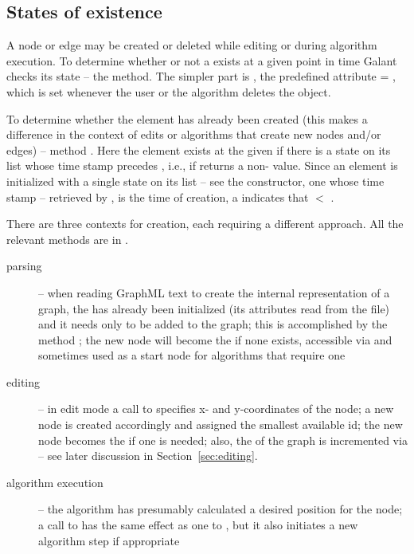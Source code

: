 \subsection{States of existence}

A node or edge may be created or deleted while editing or during algorithm
execution. To determine whether or not a  exists at a
given point in time Galant checks its state -- the 
method. The simpler part is , the predefined attribute
 = , which is set whenever the user or the
algorithm deletes the object.

To determine whether the element has already been created (this makes a
difference in the context of edits or algorithms that create new nodes and/or
edges) -- method . Here the element exists at the
given  if there is a state on its list whose time stamp precedes
, i.e., if  returns a non-
value. Since an element is initialized with a single state on its list -- see
the constructor, one
whose time stamp -- retrieved by , is the time of creation, a 
indicates that  $<$ .

There are three contexts for  creation, each requiring a different
approach. All the relevant methods are in .
\begin{description}
\item[parsing] -- when reading GraphML text to create the internal
  representation of a graph, the  has already been initialized
  (its attributes read from the file) and it needs only to be added to the
  graph; this is accomplished by the method ; the new
  node will become the  if none exists, accessible via
   and sometimes used as a start node for algorithms
  that require one
\item[editing] -- in edit mode a call to
   specifies x- and y-coordinates of
  the node; a new node is created accordingly and assigned the smallest
  available id; the new node becomes the  if one is
  needed; also, the  of the graph is
  incremented via  -- see later
  discussion in Section~\ref{sec:editing}.
\item[algorithm execution] -- the algorithm has presumably calculated a
  desired position for the node; a call to 
  has the same effect as one to , but it also initiates
  a new algorithm step if appropriate
\end{description}

